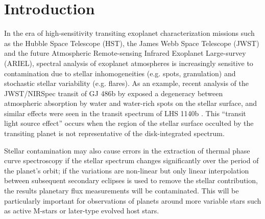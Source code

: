 \documentclass[twocolumn]{aastex631}
\begin{document}

\section{Introduction}
\label{sec:intro}

In the era of high-sensitivity transiting exoplanet characterization missions such as the Hubble Space Telescope (HST), the James Webb Space Telescope (JWST) and the future Atmospheric Remote-sensing Infrared Exoplanet Large-survey (ARIEL), spectral analysis of exoplanet atmospheres is increasingly sensitive to contamination due to stellar inhomogeneities (e.g. spots, granulation) and stochastic stellar variability (e.g. flares).  As an example, recent analysis of the JWST/NIRSpec transit of GJ 486b by \citet{moran2023} exposed a degeneracy between atmospheric absorption by water and water-rich spots on the stellar surface, and similar effects were seen in the transit spectrum of LHS 1140b \citet{cadieux2024}. This ``transit light source effect'' \citep[TLS,][see also \citet{apai2018,barclay2021,garcia2022,barclay2023}]{rackham2018} occurs when the region of the stellar surface occulted by the transiting planet is not representative of the disk-integrated spectrum.

Stellar contamination may also cause errors in the extraction of thermal phase curve spectroscopy if the stellar spectrum changes significantly over the period of the planet's orbit; if the variations are non-linear but only linear interpolation between subsequent secondary eclipses is used to remove the stellar contribution, the results planetary flux measurements will be contaminated. This will be particularly important for observations of planets around more variable stars such as active M-stars or later-type evolved host stars. %
\end{document}
